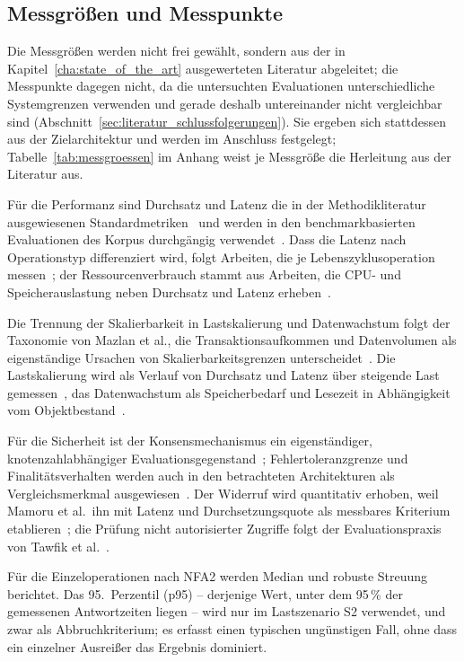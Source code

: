 \subsection{Messgrößen und Messpunkte}
\label{subsec:eval-messgroessen}

Die Messgrößen werden nicht frei gewählt, sondern aus der in Kapitel~\ref{cha:state_of_the_art} ausgewerteten Literatur abgeleitet; die Messpunkte dagegen nicht, da die untersuchten Evaluationen unterschiedliche Systemgrenzen verwenden und gerade deshalb untereinander nicht vergleichbar sind (Abschnitt~\ref{sec:literatur_schlussfolgerungen}). Sie ergeben sich stattdessen aus der Zielarchitektur und werden im Anschluss festgelegt; Tabelle~\ref{tab:messgroessen} im Anhang weist je Messgröße die Herleitung aus der Literatur aus.

Für die Performanz sind Durchsatz und Latenz die in der Methodikliteratur ausgewiesenen Standardmetriken~\cite{sehimibendaoud2023} und werden in den benchmarkbasierten Evaluationen des Korpus durchgängig verwendet~\cite{tawfik2025, joshimahajan2025, chainarong2025}. Dass die Latenz nach Operationstyp differenziert wird, folgt Arbeiten, die je Lebenszyklusoperation messen~\cite{manoj2022, mamoru2026, satybaldy2026}; der Ressourcenverbrauch stammt aus Arbeiten, die CPU- und Speicherauslastung neben Durchsatz und Latenz erheben~\cite{minango2025, amanat2022}.

Die Trennung der Skalierbarkeit in Lastskalierung und Datenwachstum folgt der Taxonomie von Mazlan et al., die Transaktionsaufkommen und Datenvolumen als eigenständige Ursachen von Skalierbarkeitsgrenzen unterscheidet~\cite{mazlan2020}. Die Lastskalierung wird als Verlauf von Durchsatz und Latenz über steigende Last gemessen~\cite{joshimahajan2025, hashim2021, sehimibendaoud2023}, das Datenwachstum als Speicherbedarf und Lesezeit in Abhängigkeit vom Objektbestand~\cite{giao2026, mamoru2026, farin2025}.

Für die Sicherheit ist der Konsensmechanismus ein eigenständiger, knotenzahlabhängiger Evaluationsgegenstand~\cite{hashim2021}; Fehlertoleranzgrenze und Finalitätsverhalten werden auch in den betrachteten Architekturen als Vergleichsmerkmal ausgewiesen~\cite{farin2025, verma2024}. Der Widerruf wird quantitativ erhoben, weil Mamoru et al.\ ihn mit Latenz und Durchsetzungsquote als messbares Kriterium etablieren~\cite{mamoru2026}; die Prüfung nicht autorisierter Zugriffe folgt der Evaluationspraxis von Tawfik et al.~\cite{tawfik2025, torongo2023}.

Für die Einzeloperationen nach NFA2 werden Median und robuste Streuung berichtet. Das 95.~Perzentil (p95) -- derjenige Wert, unter dem 95\,\% der gemessenen Antwortzeiten liegen -- wird nur im Lastszenario S2 verwendet, und zwar als Abbruchkriterium; es erfasst einen typischen ungünstigen Fall, ohne dass ein einzelner Ausreißer das Ergebnis dominiert.

